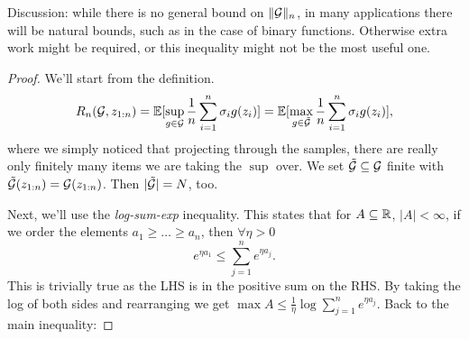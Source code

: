 \documentclass[twoside]{article}
\newcommand{\zn}{z_{1:n}}
\newcommand{\supg}{\sup_{g \in \cG}}
\begin{document}
Discussion: while there is no general bound on $ \| \mathcal{G} \|_{n}$, in many applications there will be natural bounds, such as in the case of binary functions. Otherwise extra work might be required, or this inequality might not be the most useful one.

\begin{proof}
We'll start from the definition.
\begin{align*}
    R_n(\cG, \zn) = \EE{ \supg \frac1n \sum_{i=1}^n \sigma_i g(z_i) } 
    = \EE{ \max_{g \in \tilde{\cG}} \frac1n \sum_{i=1}^n \sigma_i g(z_i) }, 
\end{align*}
where we simply noticed that projecting through the samples, there are really only finitely many items we are taking the $\sup$ over. We set $\tilde{\mathcal{G}} \subseteq \mathcal{G}$ finite with $\tilde{\cG}(\zn) = \cG(\zn)$. Then $|\tilde{\mathcal{G}}| = N$, too.

Next, we'll use the \textit{log-sum-exp} inequality. This states that for $A \subseteq \mathbb{R}$, $|A| < \infty$, if we order the elements $a_1 \geq \dotsc \geq a_n$, then $\forall \eta > 0$
\begin{equation*}
     e^{\eta a_1} \leq \sum_{j=1}^n e^{\eta a_j}.
\end{equation*}
This is trivially true as the LHS is in the positive sum on the RHS.
By taking the log of both sides and rearranging we get $\max A \leq \frac1\eta \log \sum_{j=1}^n e^{\eta a_j}$. Back to the main inequality:


\end{proof}
\end{document}
